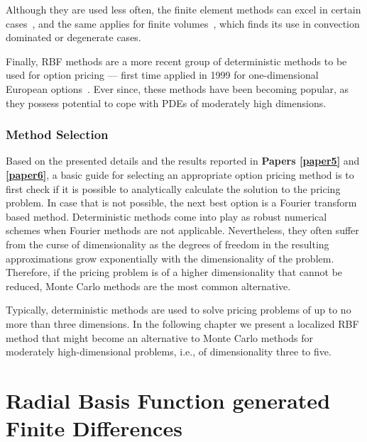 \documentclass{UUThesisTemplate}
\begin{document}
\par
Although they are used less often, the finite element methods can excel in certain cases~\cite{zvan1998general, forsyth1999finite, heinecke2012highly}, and the same applies for finite volumes~\cite{zvan2001finite}, which finds its use in convection dominated or degenerate cases.

\par
Finally, RBF methods are a more recent group of deterministic methods to be used for option pricing --- first time applied in 1999 for one-dimensional European options~\cite{hon1999radial}. Ever since, these methods have been becoming popular, as they possess potential to cope with PDEs of moderately high dimensions.
%



%
\subsection{Method Selection}

\par
Based on the presented details and the results reported in \textbf{Papers \ref{paper5}} and \textbf{\ref{paper6}}, a basic guide for selecting an appropriate option pricing method is to first check if it is possible to analytically calculate the solution to the pricing problem. In case that is not possible, the next best option is a Fourier transform based method. Deterministic methods come into play as robust numerical schemes when Fourier methods are not applicable. Nevertheless, they often suffer from the curse of dimensionality as the degrees of freedom in the resulting approximations grow exponentially with the dimensionality of the problem. Therefore, if the pricing problem is of a higher dimensionality that cannot be reduced, Monte Carlo methods are the most common alternative.

\par
Typically, deterministic methods are used to solve pricing problems of up to no more than three dimensions. In the following chapter we present a localized RBF method that might become an alternative to Monte Carlo methods for moderately high-dimensional problems, i.e., of dimensionality three to five. 
%
%





%
\chapter{Radial Basis Function generated Finite Differences}
\label{ch:rbffd}
\end{document}
